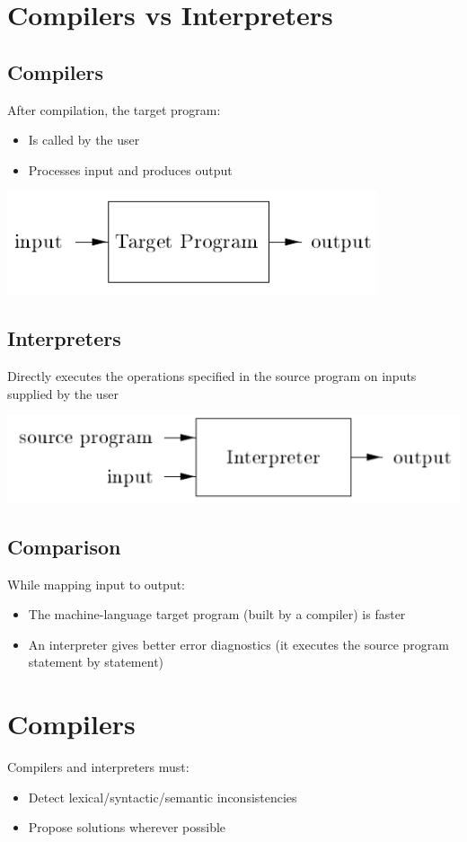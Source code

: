 \documentclass{article}[18pt]
\begin{document}
\section{Compilers vs Interpreters}
\subsection{Compilers}
After compilation, the target program:
\begin{itemize}
	\item Is called by the user
	\item Processes input and produces output
\end{itemize}
\begin{center}
	\includegraphics[scale=0.7]{Compiler}
\end{center}
\subsection{Interpreters}
Directly executes the operations specified in the source program on inputs supplied by the user
\begin{center}
	\includegraphics[scale=0.7]{Interpreter}
\end{center}
\subsection{Comparison}
While mapping input to output:
\begin{itemize}
	\item The machine-language target program (built by a compiler) is faster
	\item An interpreter gives better error diagnostics (it executes the source program statement by statement)
\end{itemize}
\section{Compilers}
Compilers and interpreters must:
\begin{itemize}
	\item Detect lexical/syntactic/semantic inconsistencies 
	\item Propose solutions wherever possible
\end{itemize}
\end{document}
